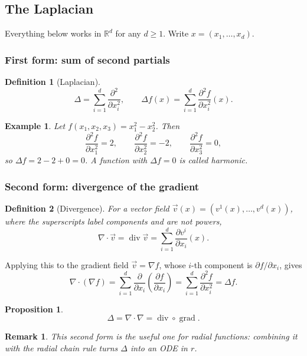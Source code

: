 \documentclass{article}
\newtheorem{definition}{Definition}
\newtheorem*{example}{Example}
\newtheorem{remark}{Remark}
\newtheorem{proposition}{Proposition}
\begin{document}
\subsection{The Laplacian}
Everything below works in $\mathbb{R}^d$ for any $d \geq 1$. Write $x = (x_1, \dots, x_d)$.

\subsubsection*{First form: sum of second partials}
\begin{definition}[Laplacian]
    \begin{equation}
        \Delta = \sum_{i=1}^{d} \frac{\partial^2}{\partial x_i^2},
        \qquad
        \Delta f(x) = \sum_{i=1}^{d} \frac{\partial^2 f}{\partial x_i^2}(x).
    \end{equation}
\end{definition}
\begin{example}
    Let $f(x_1,x_2,x_3) = x_1^2 - x_2^2$. Then
    \begin{equation}
        \frac{\partial^2 f}{\partial x_1^2} = 2, \qquad
        \frac{\partial^2 f}{\partial x_2^2} = -2, \qquad
        \frac{\partial^2 f}{\partial x_3^2} = 0,
    \end{equation}
    so $\Delta f = 2 - 2 + 0 = 0$. A function with $\Delta f = 0$ is called \emph{harmonic}.
\end{example}

\subsubsection*{Second form: divergence of the gradient}
\begin{definition}[Divergence]
    For a vector field $\vec{v}(x) = (v^1(x), \dots, v^d(x))$, where the superscripts label components and are not powers,
    \begin{equation}
        \nabla \cdot \vec{v} = \operatorname{div} \vec{v} = \sum_{i=1}^{d} \frac{\partial v^i}{\partial x_i}(x).
    \end{equation}
\end{definition}
Applying this to the gradient field $\vec{v} = \nabla f$, whose $i$-th component is $\partial f / \partial x_i$, gives
\begin{equation}
    \nabla \cdot (\nabla f) = \sum_{i=1}^{d} \frac{\partial}{\partial x_i}\left( \frac{\partial f}{\partial x_i} \right) = \sum_{i=1}^{d} \frac{\partial^2 f}{\partial x_i^2} = \Delta f.
\end{equation}
\begin{proposition}
    \begin{equation}
        \Delta = \nabla \cdot \nabla = \operatorname{div} \circ \operatorname{grad}.
    \end{equation}
\end{proposition}
\begin{remark}
    This second form is the useful one for radial functions: combining it with the radial chain rule turns $\Delta$ into an ODE in $r$.
\end{remark}
\end{document}
